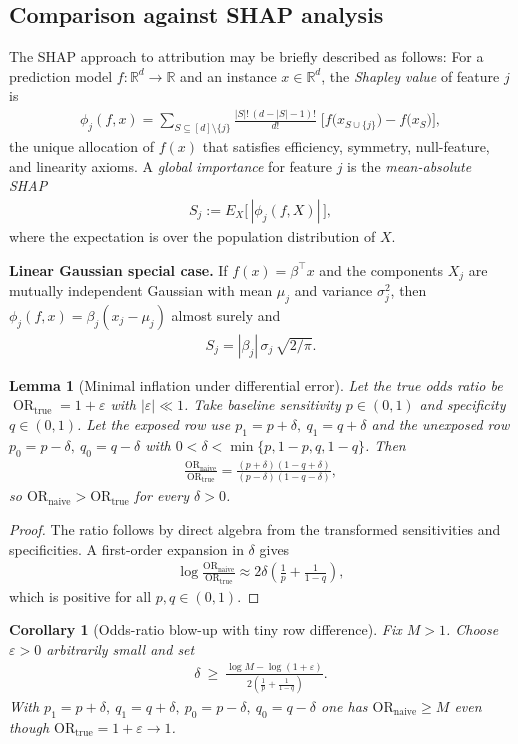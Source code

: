 \documentclass[pdflatex,sn-mathphys-num]{sn-jnl}%
\def\EQSP{3pt}
\newcommand{\cgather}[2][\EQSP]{\begingroup\setlength\abovedisplayskip{#1}\setlength\belowdisplayskip{#1}\begin{gather} #2 \end{gather}\endgroup\noindent}
\theoremstyle{thmstyleone}%
\newtheorem{lemma}[theorem]{Lemma} %
\newtheorem{corollary}[theorem]{Corollary} %
\theoremstyle{thmstyletwo}%
\theoremstyle{thmstylethree}%
\begin{document}
\subsection{Comparison against SHAP analysis} The SHAP approach to attribution may be briefly described as follows: For a prediction model $f:\mathbb R^{d}\to\mathbb R$ and an instance $x\in\mathbb R^{d}$, the \emph{Shapley value} of feature $j$
is
\cgather{
\phi_{j}(f,x)
=\!\!\sum_{S\subseteq[d]\setminus\{j\}}\!\!
   \frac{|S|!\,(d-|S|-1)!}{d!}\;
   \bigl[f\bigl(x_{S\cup\{j\}}\bigr)-f\bigl(x_{S}\bigr)\bigr],
}
the unique allocation of $f(x)$ that satisfies efficiency, symmetry,
null-feature, and linearity axioms.
A \emph{global importance} for feature $j$ is the
\emph{mean-absolute SHAP}
\cgather{
S_{j} := E_{X}\bigl[\,|\phi_{j}(f,X)|\,\bigr],
\label{SHAP-MA}
}
where the expectation is over the population distribution of $X$.

\textbf{Linear Gaussian special case.}
If $f(x)=\beta^{\top}x$ and the components $X_{j}$ are mutually
independent Gaussian with mean $\mu_{j}$ and variance $\sigma_{j}^{2}$,
then $\phi_{j}(f,x)=\beta_{j}(x_{j}-\mu_{j})$ almost surely and
\cgather{
S_{j} = |\beta_{j}|\,\sigma_{j}\,\sqrt{2/\pi}.
\label{SHAP-MA-Lin}
}
%
\begin{lemma}[Minimal inflation under differential error]
\label{lem:minimal}
Let the true odds ratio be $\operatorname{OR}_{\mathrm{true}}=1+\varepsilon$
with $|\varepsilon|\ll1$.  
Take baseline sensitivity $p\in(0,1)$ and specificity $q\in(0,1)$.  
Let the exposed row use $p_1=p+\delta,\ q_1=q+\delta$ and the unexposed row
$p_0=p-\delta,\ q_0=q-\delta$ with $0<\delta<\min\{p,1-p,q,1-q\}$.  
Then
\cgather{
\frac{\mathrm{OR}_{\text{naive}}}{\mathrm{OR}_{\text{true}}}
= \frac{(p+\delta)(1-q+\delta)}{(p-\delta)(1-q-\delta)} ,
}
so $\mathrm{OR}_{\text{naive}}>\mathrm{OR}_{\text{true}}$ for every $\delta>0$.
\end{lemma}

\begin{proof}
The ratio follows by direct algebra from the transformed sensitivities
and specificities. A first-order expansion in $\delta$ gives
\cgather{
\log\frac{\mathrm{OR}_{\text{naive}}}{\mathrm{OR}_{\text{true}}}
\approx 2\delta\left(\frac{1}{p}+\frac{1}{1-q}\right),
}
which is positive for all $p,q\in(0,1)$.
\end{proof}

\begin{corollary}[Odds-ratio blow-up with tiny row difference]\label{corshap}
Fix $M>1$. Choose $\varepsilon>0$ arbitrarily small and set
\cgather{
\delta \ \ge\ \frac{\log M-\log(1+\varepsilon)}{\,2\left(\frac{1}{p}+\frac{1}{1-q}\right)} .
}
With $p_1=p+\delta,\ q_1=q+\delta,\ p_0=p-\delta,\ q_0=q-\delta$ one has
$\mathrm{OR}_{\text{naive}}\ge M$ even though $\mathrm{OR}_{\text{true}}=1+\varepsilon\to1$.
\end{corollary}
\end{document}
